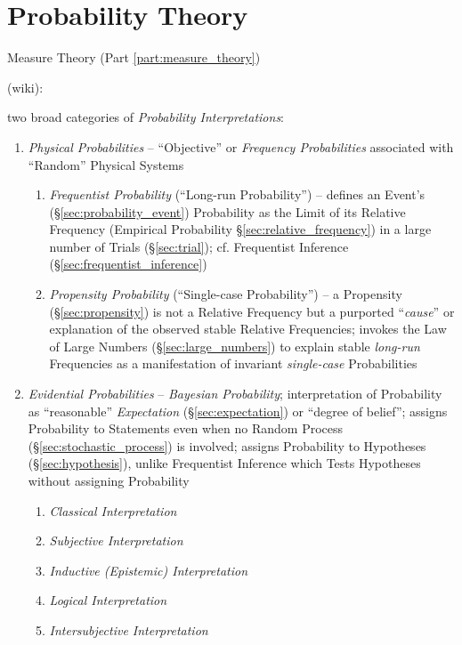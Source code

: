 \part{Probability Theory}\label{part:probability_theory}

\fist Measure Theory (Part \ref{part:measure_theory})

(wiki):

two broad categories of \emph{Probability Interpretations}:
\begin{enumerate}
  \item \emph{Physical Probabilities} -- ``Objective'' or \emph{Frequency
    Probabilities} associated with ``Random'' Physical Systems
    \begin{enumerate}
      \item \emph{Frequentist Probability} (``Long-run Probability'') -- defines
        an Event's (\S\ref{sec:probability_event}) Probability as the Limit of
        its Relative Frequency (Empirical Probability
        \S\ref{sec:relative_frequency}) in a large number of Trials
        (\S\ref{sec:trial}); cf. Frequentist Inference
        (\S\ref{sec:frequentist_inference})
      \item \emph{Propensity Probability} (``Single-case Probability'') -- a
        Propensity (\S\ref{sec:propensity}) is not a Relative Frequency but a
        purported ``\emph{cause}'' or explanation of the observed stable
        Relative Frequencies; invokes the Law of Large Numbers
        (\S\ref{sec:large_numbers}) to explain stable \emph{long-run}
        Frequencies as a manifestation of invariant \emph{single-case}
        Probabilities
    \end{enumerate}
  \item \emph{Evidential Probabilities} -- \emph{Bayesian Probability};
    interpretation of Probability as ``reasonable'' \emph{Expectation}
    (\S\ref{sec:expectation}) or ``degree of belief''; assigns Probability to
    Statements even when no Random Process (\S\ref{sec:stochastic_process}) is
    involved; assigns Probability to Hypotheses (\S\ref{sec:hypothesis}), unlike
    Frequentist Inference which Tests Hypotheses without assigning Probability
    \begin{enumerate}
      \item \emph{Classical Interpretation}
      \item \emph{Subjective Interpretation}
      \item \emph{Inductive (Epistemic) Interpretation}
      \item \emph{Logical Interpretation}
      \item \emph{Intersubjective Interpretation}
    \end{enumerate}
\end{enumerate}

